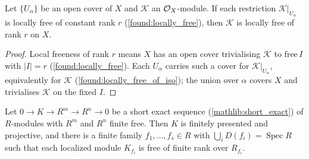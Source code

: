 \begin{lemma}
  \label{lem:isLocallyFree_local}
  Let \(\{U_\alpha\}\) be an open cover of \(X\) and \(\mathcal K\) an
  \(\mathcal{O}_X\)-module.  If each restriction \(\mathcal K|_{U_\alpha}\) is locally free
  of constant rank \(r\) (\cref{found:locally_free}), then \(\mathcal K\) is locally
  free of rank \(r\) on \(X\).
\end{lemma}

\begin{proof}
  \leanok
  Local freeness of rank \(r\) means \(X\) has an open cover trivialising
  \(\mathcal K\) to \(\mathrm{free}\,I\) with \(|I|=r\) (\cref{found:locally_free}).
  Each \(U_\alpha\) carries such a cover for \(\mathcal K|_{U_\alpha}\), equivalently
  for \(\mathcal K\) (\cref{found:locally_free_of_iso}); the union over \(\alpha\)
  covers \(X\) and trivialises \(\mathcal K\) on the fixed \(I\).
\end{proof}

\begin{lemma}
  \label{lem:module_kernel_free_basicOpen_cover}
  Let \(0\to K\to R^m\to R^n\to 0\) be a short exact sequence
  (\cref{mathlib:short_exact}) of \(R\)-modules with \(R^m\) and \(R^n\) finite
  free.  Then \(K\) is finitely presented and projective, and there is a finite
  family \(f_1,\dots,f_s\in R\) with \(\bigcup_i D(f_i)=\operatorname{Spec}R\) such
  that each localized module \(K_{f_i}\) is free of finite rank over \(R_{f_i}\).
\end{lemma}

